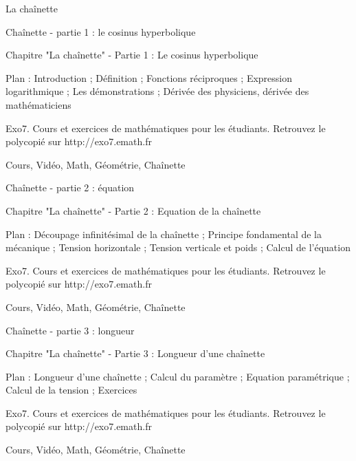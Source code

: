 
   La chaînette




Chaînette - partie 1 : le cosinus hyperbolique



Chapitre "La chaînette" - Partie 1 : Le cosinus hyperbolique

Plan : Introduction ; Définition ; Fonctions réciproques ; 
Expression logarithmique ; Les démonstrations ;
Dérivée des physiciens, dérivée des mathématiciens

Exo7. Cours et exercices de mathématiques pour les étudiants.
Retrouvez le polycopié sur http://exo7.emath.fr


Cours, Vidéo, Math, Géométrie, Chaînette



Chaînette - partie 2 : équation



Chapitre "La chaînette" - Partie 2 : Equation de la chaînette

Plan : Découpage infinitésimal de la chaînette ; 
Principe fondamental de la mécanique ; Tension horizontale ;
Tension verticale et poids ; Calcul de l'équation

Exo7. Cours et exercices de mathématiques pour les étudiants.
Retrouvez le polycopié sur http://exo7.emath.fr


Cours, Vidéo, Math, Géométrie, Chaînette



Chaînette - partie 3 : longueur



Chapitre "La chaînette" - Partie 3 : Longueur d'une chaînette

Plan : Longueur d'une chaînette ; Calcul du paramètre ;
Equation paramétrique ; Calcul de la tension ; Exercices


Exo7. Cours et exercices de mathématiques pour les étudiants.
Retrouvez le polycopié sur http://exo7.emath.fr


Cours, Vidéo, Math, Géométrie, Chaînette

